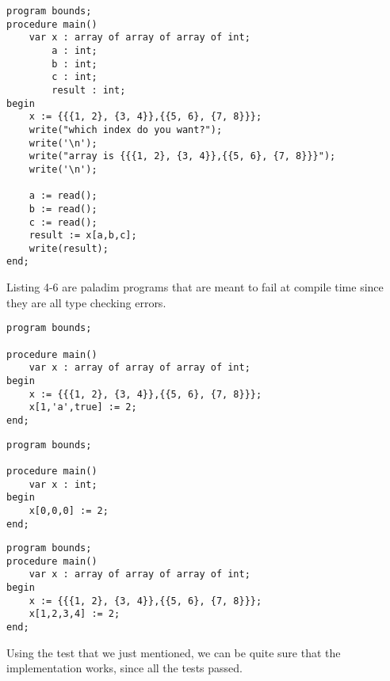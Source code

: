 \begin{lstlisting}[style=paladim, caption=testIndexBounds.pal tests bounds]
program bounds;
procedure main()
    var x : array of array of array of int;
        a : int;
        b : int;
        c : int;
        result : int;
begin
    x := {{{1, 2}, {3, 4}},{{5, 6}, {7, 8}}};
    write("which index do you want?");
    write('\n');
    write("array is {{{1, 2}, {3, 4}},{{5, 6}, {7, 8}}}");
    write('\n');

    a := read();
    b := read();
    c := read();
    result := x[a,b,c];
    write(result);
end;
\end{lstlisting}
Listing 4-6 are paladim programs that are meant to fail at compile time since they are all type checking errors.

\begin{lstlisting}[style=paladim, caption=testWrongIndexType.pal tests invalid types in indexing]
program bounds;

procedure main()
    var x : array of array of array of int;
begin
    x := {{{1, 2}, {3, 4}},{{5, 6}, {7, 8}}};
    x[1,'a',true] := 2;
end;
\end{lstlisting}

\begin{lstlisting}[style=paladim, caption=testZeroRank.pal tests zero rank]
program bounds;

procedure main()
    var x : int;
begin
    x[0,0,0] := 2;
end;
\end{lstlisting}

\begin{lstlisting}[style=paladim, caption=testWrongRank.pal tests wrong rank]
program bounds;
procedure main()
    var x : array of array of array of int;
begin
    x := {{{1, 2}, {3, 4}},{{5, 6}, {7, 8}}};
    x[1,2,3,4] := 2;
end;
\end{lstlisting}
Using the test that we just mentioned, we can be quite sure that the implementation works, since all the tests passed.

